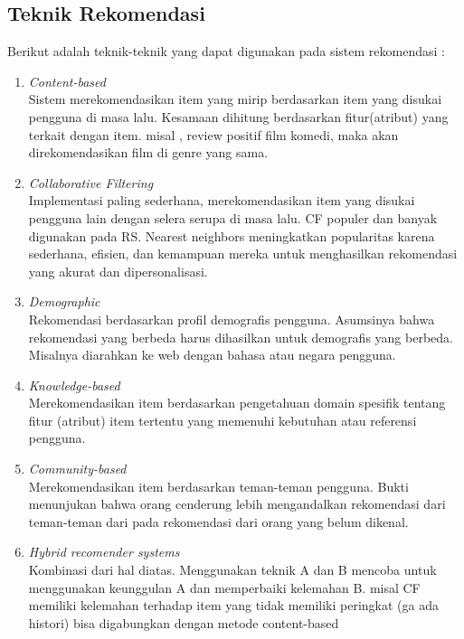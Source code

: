 \subsection{Teknik Rekomendasi}
\label{sec:teknik rekomendasi}
Berikut adalah teknik-teknik yang dapat digunakan pada sistem rekomendasi : \\%
\begin{enumerate}
	\item \textit{Content-based}\\
		Sistem merekomendasikan item yang mirip berdasarkan item yang disukai pengguna di masa lalu. Kesamaan dihitung berdasarkan fitur(atribut) yang terkait dengan item. misal , review positif film komedi, maka akan direkomendasikan film di genre yang sama. 

	\item \textit{Collaborative Filtering} \\
		Implementasi paling sederhana, merekomendasikan item yang disukai pengguna lain dengan selera serupa di masa lalu. CF populer dan banyak digunakan pada RS. Nearest neighbors meningkatkan popularitas karena sederhana, efisien, dan kemampuan mereka untuk menghasilkan rekomendasi yang akurat dan dipersonalisasi.
	
	\item \textit{Demographic} \\
		Rekomendasi berdasarkan profil demografis pengguna. Asumsinya bahwa rekomendasi yang berbeda harus dihasilkan untuk demografis yang berbeda. Misalnya diarahkan ke web dengan bahasa atau negara pengguna. 

	\item \textit{Knowledge-based} \\
		Merekomendasikan item berdasarkan pengetahuan domain spesifik tentang fitur (atribut) item tertentu yang memenuhi kebutuhan atau referensi pengguna. 

	\item \textit{Community-based} \\
		Merekomendasikan item berdasarkan teman-teman pengguna. Bukti menunjukan bahwa orang cenderung lebih mengandalkan rekomendasi dari teman-teman dari pada rekomendasi dari orang yang belum dikenal. 

	\item \textit{Hybrid recomender systems} \\
		Kombinasi dari hal diatas. Menggunakan teknik A dan B mencoba untuk menggunakan keunggulan A dan memperbaiki kelemahan B. misal CF memiliki kelemahan terhadap item yang tidak memiliki peringkat (ga ada histori)  bisa digabungkan dengan metode content-based
\end{enumerate}

